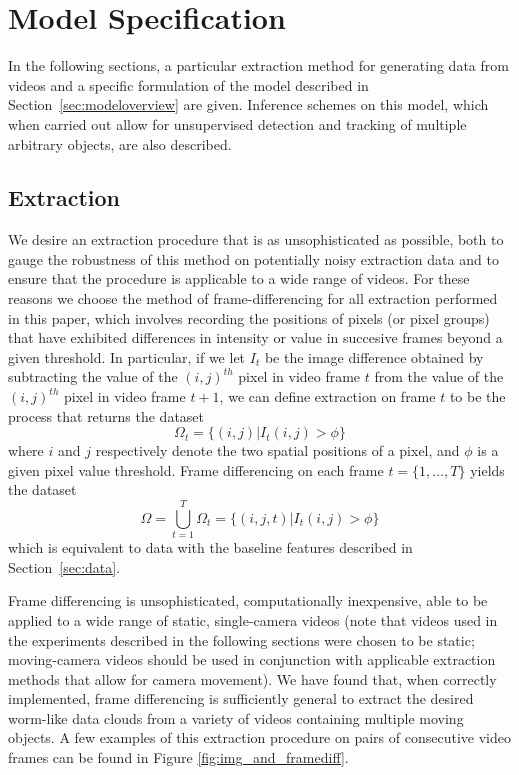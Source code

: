\documentclass[smallcondensed, final]{svjour3}
\begin{document}
\section{Model Specification}
\label{sec:modelspec}

In the following sections, a particular extraction method for generating data from videos and a specific formulation of the model described in Section~\ref{sec:modeloverview} are given. Inference schemes on this model, which when carried out allow for unsupervised detection and tracking of multiple arbitrary objects, are also described.



\subsection{Extraction}
\label{sec:modelspec_extraction}

We desire an extraction procedure that is as unsophisticated as possible, both to gauge the robustness of this method on potentially noisy extraction data and to ensure that the procedure is applicable to a wide range of videos. For these reasons we choose the method of frame-differencing for all extraction performed in this paper, which involves recording the positions of pixels (or pixel groups) that have exhibited differences in intensity or value in succesive frames beyond a given threshold. In particular, if we let $I_{t}$ be the image difference obtained by subtracting the value of the $(i,j)^{th}$ pixel in video frame $t$ from the value of the $(i,j)^{th}$ pixel in video frame $t+1$, we can define extraction on frame $t$ to be the process that returns the dataset
\begin{equation}
	\Omega_{t} = \{ (i,j) | I_{t}(i,j) > \phi \}
\end{equation}
where $i$ and $j$ respectively denote the two spatial positions of a pixel, and $\phi$ is a given pixel value threshold. Frame differencing on each frame $t =\{1, \ldots, T \}$ yields the dataset
\begin{equation}
	\Omega = \bigcup_{t=1}^{T} \Omega_{t} = \{ (i,j,t) | I_{t}(i,j) > \phi \}
\end{equation}
which is equivalent to data with the baseline features described in Section~\ref{sec:data}.

Frame differencing is unsophisticated, computationally inexpensive, able to be applied to a wide range of static, single-camera videos (note that videos used in the experiments described in the following sections were chosen to be static; moving-camera videos should be used in conjunction with applicable extraction methods that allow for camera movement). We have found that, when correctly implemented, frame differencing is sufficiently general to extract the desired worm-like data clouds from a variety of videos containing multiple moving objects. A few examples of this extraction procedure on pairs of consecutive video frames can be found in Figure \ref{fig:img_and_framediff}.
\end{document}
